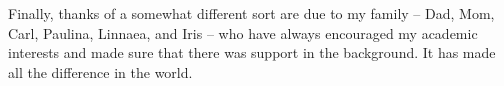 Finally, thanks of a somewhat different sort are due to my family -- Dad, Mom, Carl, Paulina, Linnaea, and Iris -- who have always encouraged my academic interests and made sure that there was support in the background. It has made all the difference in the world. 

\cleardoublepage


\renewcommand\contentsname{Table of Contents}
\tableofcontents
\cleardoublepage
{}    %

\listoftables
\cleardoublepage
{}		%

\listoffigures
\cleardoublepage
{}		%


